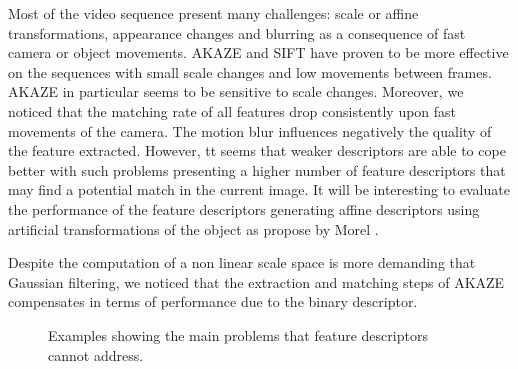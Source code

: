 Most of the video sequence present many challenges: scale or affine transformations, appearance changes and blurring as a consequence of fast camera or object movements. AKAZE and SIFT have proven to be more effective on the sequences with small scale changes and low movements between frames. AKAZE in particular seems to be sensitive to scale changes. Moreover, we noticed that the matching rate of all features drop consistently upon fast movements of the camera. The motion blur influences negatively the quality of the feature extracted. However, tt seems that weaker descriptors are able to cope better with such problems presenting a higher number of feature descriptors that may find a potential match in the current image. It will be interesting to evaluate the performance of the feature descriptors generating affine descriptors using artificial transformations of the object as propose by Morel \cite{morel2009}.

Despite the computation of a non linear scale space is more demanding that Gaussian filtering, we noticed that the extraction and matching steps of AKAZE compensates in terms of performance due to the binary descriptor.


\begin{figure}[!htb]
	\vspace{2mm}
\centerline{%
	}
	\vspace{-2mm}
\caption{Examples showing the main problems that feature descriptors cannot address. }
\label{fig:tracking_results_scale}
\end{figure} 


